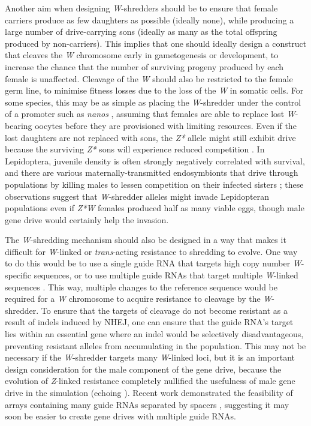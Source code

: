 \documentclass[]{rsos}%
\begin{document}
Another aim when designing \emph{W}-shredders should be to ensure that
female carriers produce as few daughters as possible (ideally none),
while producing a large number of drive-carrying sons (ideally as many
as the total offspring produced by non-carriers). This implies that one
should ideally design a construct that cleaves the \emph{W} chromosome
early in gametogenesis or development, to increase the chance that the
number of surviving progeny produced by each female is unaffected.
Cleavage of the \emph{W} should also be restricted to the female germ
line, to minimise fitness losses due to the loss of the \emph{W} in
somatic cells. For some species, this may be as simple as placing the
\emph{W}-shredder under the control of a promoter such as \emph{nanos}
\citep{champer2018re, zhang2018si}, assuming that females are able to
replace lost \emph{W}-bearing oocytes before they are provisioned with
limiting resources. Even if the lost daughters are not replaced with
sons, the \emph{Z*} allele might still exhibit drive because the
surviving \emph{Z*} sons will experience reduced competition
\citep[somewhat like \emph{Medea};][]{hay2010en}. In Lepidoptera,
juvenile density is often strongly negatively correlated with survival,
and there are various maternally-transmitted endosymbionts that drive
through populations by killing males to lessen competition on their
infected sisters \citep[e.g.][]{jiggins2000bu, jiggins2003ma}; these
observations suggest that \emph{W}-shredder alleles might invade
Lepidopteran populations even if \emph{Z*W} females produced half as
many viable eggs, though male gene drive would certainly help the
invasion.

The \emph{W}-shredding mechanism should also be designed in a way that
makes it difficult for \emph{W}-linked or \emph{trans}-acting resistance
to shredding to evolve. One way to do this would be to use a single
guide RNA that targets high copy number \emph{W}-specific sequences, or
to use multiple guide RNAs that target multiple \emph{W}-linked
sequences \citep{champer2018re}. This way, multiple changes to the
reference sequence would be required for a \emph{W} chromosome to
acquire resistance to cleavage by the \emph{W}-shredder. To ensure that
the targets of cleavage do not become resistant as a result of indels
induced by NHEJ, one can ensure that the guide RNA's target lies within
an essential gene where an indel would be selectively disadvantageous,
preventing resistant alleles from accumulating in the population. This
may not be necessary if the \emph{W}-shredder targets many
\emph{W}-linked loci, but it is an important design consideration for
the male component of the gene drive, because the evolution of
\emph{Z}-linked resistance completely nullified the usefulness of male
gene drive in the simulation (echoing \citep{unckless2017ev}). Recent
work demonstrated the feasibility of arrays containing many guide RNAs
separated by spacers \citep{kurata2018hi}, suggesting it may soon be
easier to create gene drives with multiple guide RNAs.
\end{document}
